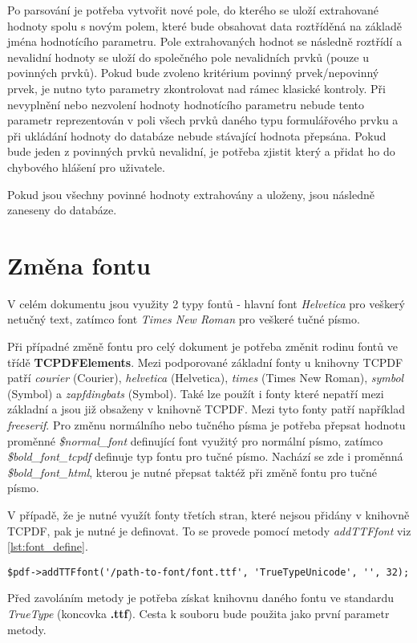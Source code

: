 Po parsování je potřeba vytvořit nové pole, do kterého se uloží extrahované hodnoty spolu s novým polem, které bude obsahovat data roztříděná na základě jména hodnotícího parametru. Pole extrahovaných hodnot se následně roztřídí a nevalidní hodnoty se uloží do společného pole nevalidních prvků (pouze u povinných prvků). Pokud bude zvoleno kritérium povinný prvek/nepovinný prvek, je nutno tyto parametry zkontrolovat nad rámec klasické kontroly. Při nevyplnění nebo nezvolení hodnoty hodnotícího parametru nebude tento parametr reprezentován v poli všech prvků daného typu formulářového prvku a při ukládání hodnoty do databáze nebude stávající hodnota přepsána. Pokud bude jeden z povinných prvků nevalidní, je potřeba zjistit který a přidat ho do chybového hlášení pro uživatele.
\par
Pokud jsou všechny povinné hodnoty extrahovány a uloženy, jsou následně zaneseny do databáze.

\section{Změna fontu}
V celém dokumentu jsou využity 2 typy fontů - hlavní font \textit{Helvetica} pro veškerý netučný text, zatímco font \textit{Times New Roman} pro veškeré tučné písmo.
\par
Při případné změně fontu pro celý dokument je potřeba změnit rodinu fontů ve třídě \textbf{TCPDFElements}. Mezi podporované základní fonty u knihovny TCPDF patří \textit{courier} (Courier), \textit{helvetica} (Helvetica), \textit{times} (Times New Roman), \textit{symbol} (Symbol) a \textit{zapfdingbats} (Symbol). Také lze použít i fonty které nepatří mezi základní a jsou již obsaženy v knihovně TCPDF. Mezi tyto fonty patří například \textit{freeserif}. Pro změnu normálního nebo tučného písma je potřeba přepsat hodnotu proměnné \textit{\$normal\_font} definující font využitý pro normální písmo, zatímco \textit{\$bold\_font\_tcpdf} definuje typ fontu pro tučné písmo. Nachází se zde i proměnná \textit{\$bold\_font\_html}, kterou je nutné přepsat taktéž při změně fontu pro tučné písmo.
\par
V případě, že je nutné využít fonty třetích stran, které nejsou přidány v knihovně TCPDF, pak je nutné je definovat. To se provede pomocí metody \textit{addTTFfont} viz  \ref{lst:font_define}.
\begin{lstlisting}[caption = {Nový font vložený do knihovny TCPDF}, label = {lst:font_define}, captionpos=b]
$pdf->addTTFfont('/path-to-font/font.ttf', 'TrueTypeUnicode', '', 32);
\end{lstlisting}
Před zavoláním metody je potřeba získat knihovnu daného fontu ve standardu \textit{TrueType} (koncovka \textbf{.ttf}). Cesta k souboru bude použita jako první parametr metody.

